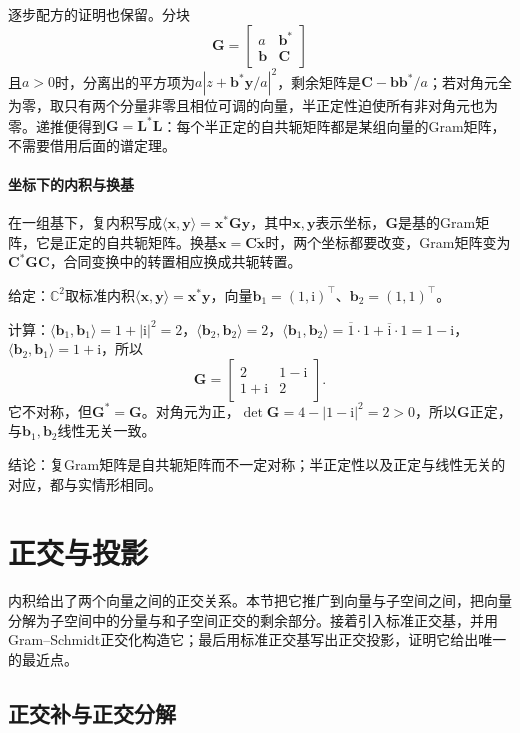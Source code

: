 逐步配方的证明也保留。分块
\[
 \bm G=\begin{bmatrix}a&\bm b^*\\\bm b&\bm C\end{bmatrix}
\]
且$a>0$时，分离出的平方项为$a|z+\bm b^*\bm y/a|^2$，剩余矩阵是$\bm C-\bm b\bm b^*/a$；若对角元全为零，取只有两个分量非零且相位可调的向量，半正定性迫使所有非对角元也为零。递推便得到$\bm G=\bm L^*\bm L$：每个半正定的自共轭矩阵都是某组向量的Gram矩阵，不需要借用后面的谱定理。

\paragraph{坐标下的内积与换基}
在一组基下，复内积写成$\langle\bm x,\bm y\rangle=\bm x^*\bm G\bm y$，其中$\bm x,\bm y$表示坐标，$\bm G$是基的Gram矩阵，它是正定的自共轭矩阵。换基$\bm x=\bm C\widetilde{\bm x}$时，两个坐标都要改变，Gram矩阵变为$\bm C^*\bm G\bm C$，合同变换中的转置相应换成共轭转置。
\begin{example}[复空间中的Gram矩阵]
\label{ex:ls-complex-gram}
给定：$\mathbb C^2$取标准内积$\langle\bm x,\bm y\rangle=\bm x^*\bm y$，向量$\bm b_1=(1,\mathrm i)^\top$、$\bm b_2=(1,1)^\top$。

计算：$\langle\bm b_1,\bm b_1\rangle=1+|\mathrm i|^2=2$，$\langle\bm b_2,\bm b_2\rangle=2$，$\langle\bm b_1,\bm b_2\rangle=\overline1\cdot1+\overline{\mathrm i}\cdot1=1-\mathrm i$，$\langle\bm b_2,\bm b_1\rangle=1+\mathrm i$，所以
\[
 \bm G=\begin{bmatrix}2&1-\mathrm i\\1+\mathrm i&2\end{bmatrix}.
\]
它不对称，但$\bm G^*=\bm G$。对角元为正，$\det\bm G=4-|1-\mathrm i|^2=2>0$，所以$\bm G$正定，与$\bm b_1,\bm b_2$线性无关一致。

结论：复Gram矩阵是自共轭矩阵而不一定对称；半正定性以及正定与线性无关的对应，都与实情形相同。
\end{example}

\section{正交与投影}
\label{sec:ls-orthogonality-and-projection}

内积给出了两个向量之间的正交关系。本节把它推广到向量与子空间之间，把向量分解为子空间中的分量与和子空间正交的剩余部分。接着引入标准正交基，并用Gram--Schmidt正交化构造它；最后用标准正交基写出正交投影，证明它给出唯一的最近点。

\subsection{正交补与正交分解}
\label{sec:ls-orthogonality}

